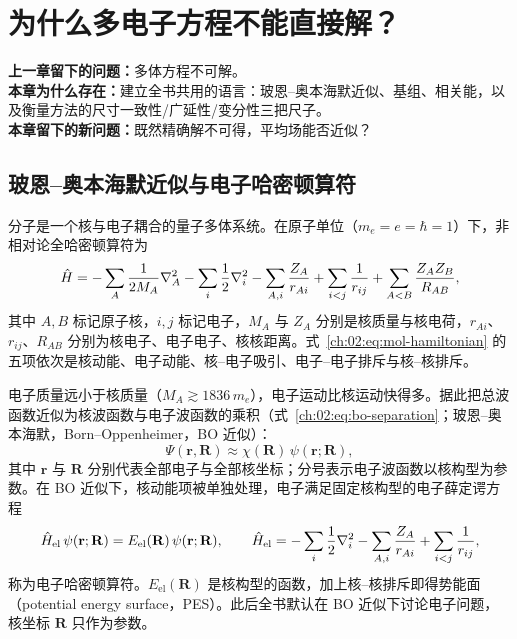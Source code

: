 
\section{为什么多电子方程不能直接解？}
\label{ch:02:sec:title}

\begin{problemchain}
\textbf{上一章留下的问题：}多体方程不可解。\\
\textbf{本章为什么存在：}建立全书共用的语言：玻恩--奥本海默近似、基组、相关能，以及衡量方法的尺寸一致性/广延性/变分性三把尺子。\\
\textbf{本章留下的新问题：}既然精确解不可得，平均场能否近似？
\end{problemchain}

\subsection{玻恩--奥本海默近似与电子哈密顿算符}
\label{ch:02:sec:bo}

分子是一个核与电子耦合的量子多体系统。在原子单位（$m_e = e = \hbar = 1$）下，非相对论全哈密顿算符为\citep{szabo1996,helgaker2000}
\begin{equation}
\hat{H}
= -\sum_{A}\frac{1}{2M_A}\nabla_A^2
-\sum_i \frac{1}{2}\nabla_i^2
-\sum_{A,i}\frac{Z_A}{r_{Ai}}
+\sum_{i<j}\frac{1}{r_{ij}}
+\sum_{A<B}\frac{Z_A Z_B}{R_{AB}},
\label{ch:02:eq:mol-hamiltonian}
\end{equation}
其中 $A,B$ 标记原子核，$i,j$ 标记电子，$M_A$ 与 $Z_A$ 分别是核质量与核电荷，$r_{Ai}$、$r_{ij}$、$R_{AB}$ 分别为核电子、电子电子、核核距离。式~\eqref{ch:02:eq:mol-hamiltonian} 的五项依次是核动能、电子动能、核--电子吸引、电子--电子排斥与核--核排斥。

电子质量远小于核质量（$M_A \gtrsim 1836\,m_e$），电子运动比核运动快得多。据此把总波函数近似为核波函数与电子波函数的乘积（式~\eqref{ch:02:eq:bo-separation}；玻恩--奥本海默，Born--Oppenheimer，BO 近似）：
\begin{equation}
\Psi(\mathbf{r},\mathbf{R}) \approx \chi(\mathbf{R})\,\psi(\mathbf{r};\mathbf{R}),
\label{ch:02:eq:bo-separation}
\end{equation}
其中 $\mathbf{r}$ 与 $\mathbf{R}$ 分别代表全部电子与全部核坐标；分号表示电子波函数以核构型为参数。在 BO 近似下，核动能项被单独处理，电子满足固定核构型的电子薛定谔方程
\begin{equation}
\hat{H}_{\mathrm{el}}\,\psi(\mathbf{r};\mathbf{R}) = E_{\mathrm{el}}(\mathbf{R})\,\psi(\mathbf{r};\mathbf{R}),
\qquad
\hat{H}_{\mathrm{el}}
= -\sum_i \frac{1}{2}\nabla_i^2
-\sum_{A,i}\frac{Z_A}{r_{Ai}}
+\sum_{i<j}\frac{1}{r_{ij}},
\label{ch:02:eq:el-hamiltonian}
\end{equation}
称为电子哈密顿算符。$E_{\mathrm{el}}(\mathbf{R})$ 是核构型的函数，加上核--核排斥即得势能面（potential energy surface，PES）。此后全书默认在 BO 近似下讨论电子问题，核坐标 $\mathbf{R}$ 只作为参数。


